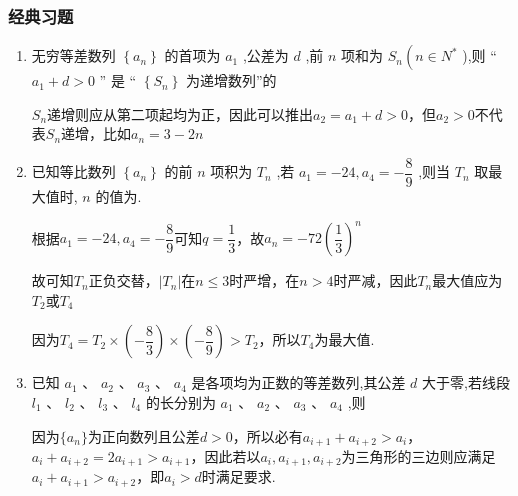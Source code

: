 \subsubsection*{经典习题}
\begin{enumerate}
    \item 无穷等差数列 $\left\{  {a}_{n}\right\}$ 的首项为 ${a}_{1}$ ,公差为 $d$ ,前 $n$ 项和为 ${S}_{n}\left( {n \in  {{N}}^{ * }}\right.$ ),则 “ ${a}_{1} + d > 0$ ” 是 “ $\left\{  {S}_{n}\right\}$ 为递增数列”的
    \begin{jieda}
        $S_n$递增则应从第二项起均为正，因此可以推出$a_2 = a_1+d > 0$，但$a_2 > 0$不代表$S_n$递增，比如$a_n = 3-2n$
    \end{jieda}
    \item 已知等比数列 $\left\{  {a}_{n}\right\}$ 的前 $n$ 项积为 ${T}_{n}$ ,若 ${a}_{1} =  - {24},{a}_{4} =  - \dfrac{8}{9}$ ,则当 ${T}_{n}$ 取最大值时, $n$ 的值为.
    \begin{jieda}
        根据${a}_{1} =  - {24},{a}_{4} =  - \dfrac{8}{9}$可知$q = \dfrac{1}{3}$，故$a_n = -72 \left(\dfrac{1}{3}\right)^n$

        故可知$T_n$正负交替，$|T_n|$在$n \leq 3$时严增，在$n > 4$时严减，因此$T_n$最大值应为$T_2$或$T_4$

        因为$T_4 = T_2 \times \left(-\dfrac{8}{3}\right) \times \left(-\dfrac{8}{9}\right) > T_2$，所以$T_4$为最大值.
    \end{jieda}
    \item 已知 ${a}_{1}$ 、 ${a}_{2}$ 、 ${a}_{3}$ 、 ${a}_{4}$ 是各项均为正数的等差数列,其公差 $d$ 大于零,若线段 ${l}_{1}$ 、 ${l}_{2}$ 、 ${l}_{3}$ 、 ${l}_{4}$ 的长分别为 ${a}_{1}$ 、 ${a}_{2}$ 、 ${a}_{3}$ 、 ${a}_{4}$ ,则
    \begin{jieda}
        因为$\{a_n\}$为正向数列且公差$d > 0$，所以必有$a_{i+1} + a_{i+2} > a_i$，$a_{i} + a_{i+2} = 2a_{i+1} > a_{i+1}$，因此若以$a_i, a_{i+1}, a_{i+2}$为三角形的三边则应满足$a_i + a_{i+1} > a_{i+2}$，即$a_i > d$时满足要求.


\end{jieda}
\end{enumerate}
